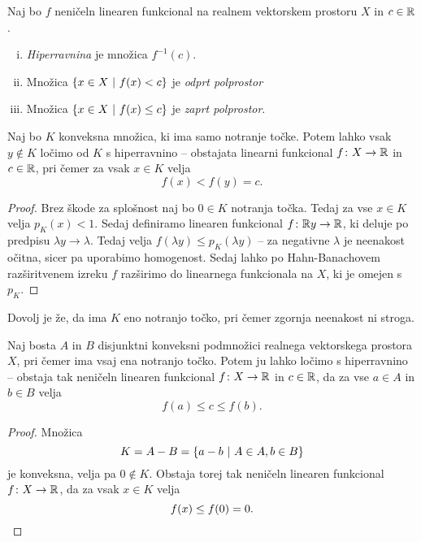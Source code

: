 \begin{definicija}
Naj bo $f$ neničeln linearen funkcional na realnem vektorskem
prostoru $X$ in $c \in \mathbb{R}$.

\begin{enumerate}[i)]
\item \emph{Hiperravnina} je
množica $f^{-1}(c)$.
\item Množica $\left\{x \in X~\middle\vert~f(x) < c\right\}$ je
\emph{odprt polprostor}
\item Množica $\left\{x \in X~\middle\vert~f(x) \leq c\right\}$ je
\emph{zaprt polprostor}.
\end{enumerate}
\end{definicija}

\begin{izrek}
Naj bo $K$ konveksna množica, ki ima samo notranje točke. Potem
lahko vsak $y \not \in K$ ločimo od $K$ s hiperravnino -- obstajata
linearni funkcional $f \colon X \to \mathbb{R}$ in $c \in \mathbb{R}$, pri čemer za
vsak $x \in K$ velja
\[
f(x) < f(y) = c.
\]
\end{izrek}

\begin{proof}
Brez škode za splošnost naj bo $0 \in K$ notranja točka. Tedaj za
vse $x \in K$ velja $p_K(x) < 1$. Sedaj definiramo linearen
funkcional $f \colon \mathbb{R} y \to \mathbb{R}$, ki deluje po predpisu
$\lambda y \to \lambda$. Tedaj velja
$f(\lambda y) \leq p_K(\lambda y)$ -- za negativne $\lambda$ je
neenakost očitna, sicer pa uporabimo homogenost. Sedaj lahko po
Hahn-Banachovem razširitvenem izreku $f$ razširimo do linearnega
funkcionala na $X$, ki je omejen s $p_K$.
\end{proof}

\begin{opomba}
Dovolj je že, da ima $K$ eno notranjo točko, pri čemer zgornja
neenakost ni stroga.
\end{opomba}

\begin{izrek}
Naj bosta $A$ in $B$ disjunktni konveksni podmnožici realnega
vektorskega prostora $X$, pri čemer ima vsaj ena notranjo točko.
Potem ju lahko ločimo s hiperravnino -- obstaja tak neničeln
linearen funkcional $f \colon X \to \mathbb{R}$ in $c \in \mathbb{R}$, da za vse
$a \in A$ in $b \in B$ velja
\[
f(a) \leq c \leq f(b).
\]
\end{izrek}

\begin{proof}
Množica
\[
K = A-B = \left\{a-b~\middle\vert~A \in A, b \in B\right\}
\]
je konveksna, velja pa $0 \not \in K$. Obstaja torej tak neničeln
linearen funkcional $f \colon X \to \mathbb{R}$, da za vsak $x \in K$ velja
\[
f(x) \leq f(0) = 0. \qedhere
\]
\end{proof}

